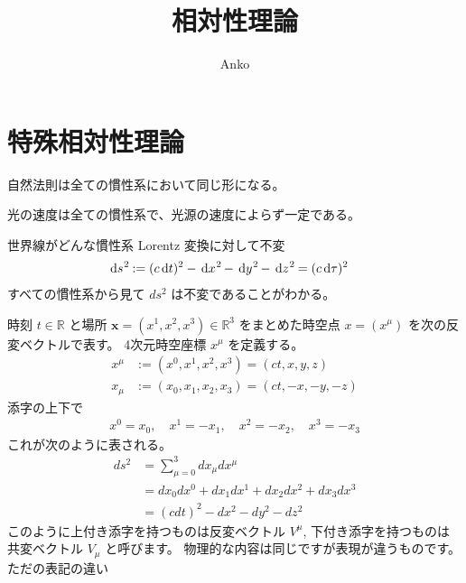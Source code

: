 \documentclass[uplatex,dvipdfmx,a4paper,11pt]{jlreq}
\title{相対性理論}
\author{Anko}
\newcommand{\RR}{\mathbb{R}}
\theoremstyle{definition}
\begin{document}
\maketitle
\tableofcontents
\clearpage

\section{特殊相対性理論}
\begin{definition}
  自然法則は全ての慣性系において同じ形になる。
\end{definition}
\begin{definition}[光速度不変の原理]
  光の速度は全ての慣性系で、光源の速度によらず一定である。
\end{definition}

世界線がどんな慣性系
Lorentz 変換に対して不変
\begin{align}
  \dl{s}^2 & := (c\dl{t})^2 - \dl{x}^2 - \dl{y}^2 - \dl{z}^2 = (c\dl{\tau})^2
\end{align}
すべての慣性系から見て $ds^2$ は不変であることがわかる。

時刻 $t\in\RR$ と場所 $\bm{x} = (x^1, x^2, x^3)\in\RR^3$ をまとめた時空点 $x = (x^\mu)$ を次の反変ベクトルで表す。
4次元時空座標 $x^\mu$ を定義する。
\begin{align}
  x^\mu & := (x^0, x^1, x^2, x^3) = (ct, x, y, z)    \\
  x_\mu & := (x_0, x_1, x_2, x_3) = (ct, -x, -y, -z)
\end{align}
添字の上下で
\begin{align}
  x^0 = x_0, \quad x^1 = -x_1, \quad x^2 = -x_2, \quad x^3 = -x_3
\end{align}
これが次のように表される。
\begin{align}
  ds^2 & = \sum_{\mu = 0}^3 dx_\mu dx^\mu            \\
       & = dx_0dx^0 + dx_1dx^1 + dx_2dx^2 + dx_3dx^3 \\
       & = (cdt)^2 - dx^2 - dy^2 - dz^2
\end{align}
このように上付き添字を持つものは反変ベクトル $V^\mu$, 下付き添字を持つものは共変ベクトル $V_\mu$ と呼びます。
物理的な内容は同じですが表現が違うものです。
ただの表記の違い
\end{document}

